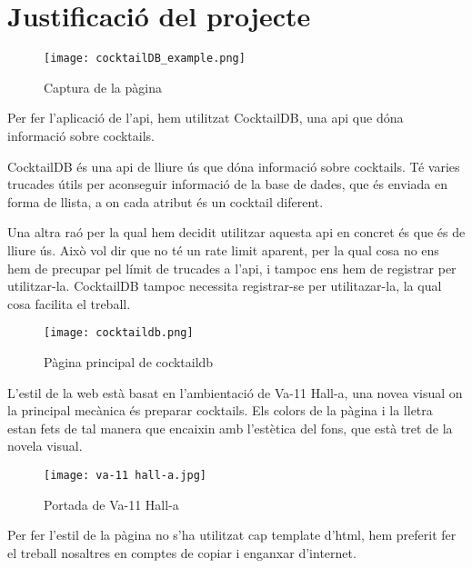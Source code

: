 \section{Justificaci\'o del projecte}

\begin{figure}[!h]
	\centering
	\texttt{[image: cocktailDB\_example.png]}
	\caption{Captura de la p\`agina}
\end{figure}

Per fer l'aplicaci\'o de l'api, hem utilitzat CocktailDB,
una api que d\'ona informaci\'o sobre cocktails.

CocktailDB \'es una api de lliure \'us que d\'ona informaci\'o sobre cocktails.
T\'e varies trucades \'utils per aconseguir informaci\'o de la base de dades,
que \'es enviada en forma de llista, a on cada atribut \'es un cocktail diferent.

Una altra ra\'o per la qual hem decidit utilitzar aquesta api en concret
\'es que \'es de lliure \'us.
Aix\`o vol dir que no t\'e un rate limit aparent,
per la qual cosa no ens hem de precupar pel l\'imit de trucades a l'api,
i tampoc ens hem de registrar per utilitzar-la.
CocktailDB tampoc necessita registrar-se per utilitazar-la,
la qual cosa facilita el treball.

\begin{figure}[!h]
	\centering
	\texttt{[image: cocktaildb.png]}
	\caption{P\`agina principal de cocktaildb}
\end{figure}

L'estil de la web est\`a basat en l'ambientaci\'o de Va-11 Hall-a,
una nove\lgem a visual on la principal mec\`anica \'es preparar cocktails.
Els colors de la p\`agina i la lletra estan fets de tal manera
que encaixin amb l'est\`etica del fons,
que est\`a tret de la novela visual.

\begin{figure}[!h]
	\centering
	\texttt{[image: va-11 hall-a.jpg]}
	\caption{Portada de Va-11 Hall-a}
\end{figure}

Per fer l'estil de la p\`agina no s'ha utilitzat cap template d'html,
hem preferit fer el treball nosaltres en comptes de copiar i enganxar d'internet.
